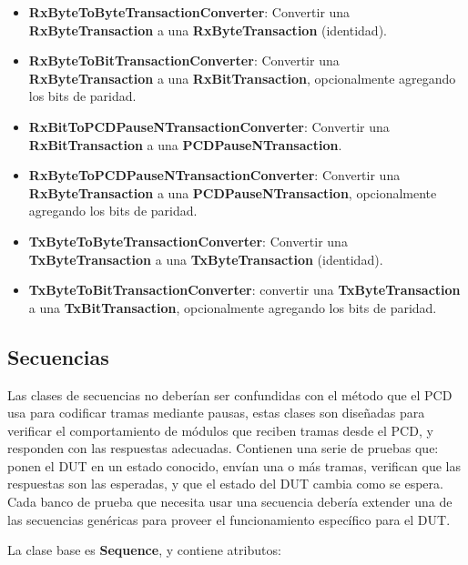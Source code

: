 \documentclass[a4paper, twoside, 11pt]{report}
\begin{document}
\begin{itemize}
  \item \textbf{RxByteToByteTransactionConverter}: Convertir una \textbf{RxByteTransaction} a una \textbf{RxByteTransaction} (identidad).
  \item \textbf{RxByteToBitTransactionConverter}: Convertir una \textbf{RxByteTransaction} a una \textbf{RxBitTransaction}, opcionalmente agregando los bits de paridad.
  \item \textbf{RxBitToPCDPauseNTransactionConverter}: Convertir una \textbf{RxBitTransaction} a una \textbf{PCDPauseNTransaction}.
  \item \textbf{RxByteToPCDPauseNTransactionConverter}: Convertir una \textbf{RxByteTransaction} a una \textbf{PCDPauseNTransaction}, opcionalmente agregando los bits de paridad.
  \item \textbf{TxByteToByteTransactionConverter}: Convertir una \textbf{TxByteTransaction} a una \textbf{TxByteTransaction} (identidad).
  \item \textbf{TxByteToBitTransactionConverter}: convertir una \textbf{TxByteTransaction} a una \textbf{TxBitTransaction}, opcionalmente agregando los bits de paridad.
\end{itemize}

\FloatBarrier
\subsection{Secuencias}

Las clases de secuencias no deberían ser confundidas con el método que el PCD usa para codificar tramas mediante pausas, estas clases son diseñadas para verificar el comportamiento de módulos que reciben tramas desde el PCD, y responden con las respuestas adecuadas. Contienen una serie de pruebas que: ponen el DUT en un estado conocido, envían una o más tramas, verifican que las respuestas son las esperadas, y que el estado del DUT cambia como se espera. Cada banco de prueba que necesita usar una secuencia debería extender una de las secuencias genéricas para proveer el funcionamiento específico para el DUT.

La clase base es \textbf{Sequence}, y contiene atributos:
\end{document}
